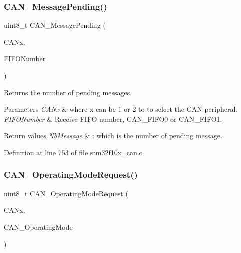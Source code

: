\subsubsection{\texorpdfstring{C\+A\+N\+\_\+\+Message\+Pending()}{CAN\_MessagePending()}}
{\footnotesize\ttfamily uint8\+\_\+t C\+A\+N\+\_\+\+Message\+Pending (\begin{DoxyParamCaption}\item[{\hyperlink{struct_c_a_n___type_def}{C\+A\+N\+\_\+\+Type\+Def} $\ast$}]{C\+A\+Nx,  }\item[{uint8\+\_\+t}]{F\+I\+F\+O\+Number }\end{DoxyParamCaption})}



Returns the number of pending messages. 


\begin{DoxyParams}{Parameters}
{\em C\+A\+Nx} & where x can be 1 or 2 to to select the C\+AN peripheral. \\
\hline
{\em F\+I\+F\+O\+Number} & Receive F\+I\+FO number, C\+A\+N\+\_\+\+F\+I\+F\+O0 or C\+A\+N\+\_\+\+F\+I\+F\+O1. \\
\hline
\end{DoxyParams}

\begin{DoxyRetVals}{Return values}
{\em Nb\+Message} & \+: which is the number of pending message. \\
\hline
\end{DoxyRetVals}


Definition at line 753 of file stm32f10x\+\_\+can.\+c.

\mbox{\label{group___c_a_n___private___functions_gab2a3630e9e3024114eb117d14e514208}} 
\subsubsection{\texorpdfstring{C\+A\+N\+\_\+\+Operating\+Mode\+Request()}{CAN\_OperatingModeRequest()}}
{\footnotesize\ttfamily uint8\+\_\+t C\+A\+N\+\_\+\+Operating\+Mode\+Request (\begin{DoxyParamCaption}\item[{\hyperlink{struct_c_a_n___type_def}{C\+A\+N\+\_\+\+Type\+Def} $\ast$}]{C\+A\+Nx,  }\item[{uint8\+\_\+t}]{C\+A\+N\+\_\+\+Operating\+Mode }\end{DoxyParamCaption})}



